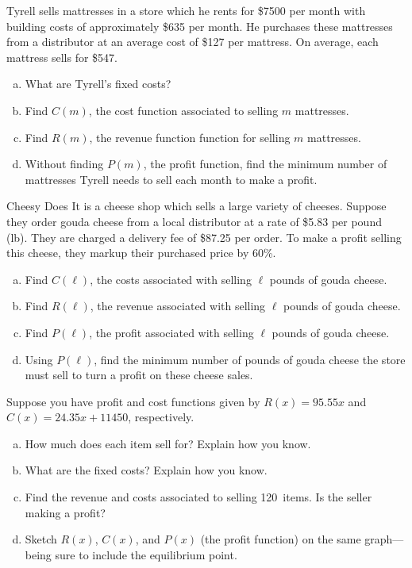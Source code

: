 \documentclass[11pt,letterpaper]{article}
\begin{document}

 Tyrell sells mattresses in a store which he rents for \$7500 per month with building costs of approximately \$635 per month. He purchases these mattresses from a distributor at an average cost of \$127 per mattress. On average, each mattress sells for \$547.
        \begin{enumerate}[(a)]
        \item What are Tyrell's fixed costs?
        \item Find $C(m)$, the cost function associated to selling $m$ mattresses. 
        \item Find $R(m)$, the revenue function function for selling $m$ mattresses. 
        \item Without finding $P(m)$, the profit function, find the minimum number of mattresses Tyrell needs to sell each month to make a profit. 
        \end{enumerate}



\newpage



 Cheesy Does It is a cheese shop which sells a large variety of cheeses. Suppose they order gouda cheese from a local distributor at a rate of \$5.83 per pound (lb). They are charged a delivery fee of \$87.25 per order. To make a profit selling this cheese, they markup their purchased price by 60\%. 
	\begin{enumerate}[(a)]
	\item Find $C(\ell)$, the costs associated with selling $\ell$ pounds of gouda cheese.
	\item Find $R(\ell)$, the revenue associated with selling $\ell$ pounds of gouda cheese.
	\item Find $P(\ell)$, the profit associated with selling $\ell$ pounds of gouda cheese.
	\item Using $P(\ell)$, find the minimum number of pounds of gouda cheese the store must sell to turn a profit on these cheese sales. 
	\end{enumerate}



\newpage



 Suppose you have profit and cost functions given by $R(x)= 95.55x$ and $C(x)= 24.35x + 11450$, respectively. 
	\begin{enumerate}[(a)]
	\item How much does each item sell for? Explain how you know.
	\item What are the fixed costs? Explain how you know.
	\item Find the revenue and costs associated to selling 120~items. Is the seller making a profit?
	\item Sketch $R(x)$, $C(x)$, and $P(x)$ (the profit function) on the same graph---being sure to include the equilibrium point. 
	\end{enumerate}
\end{document}
